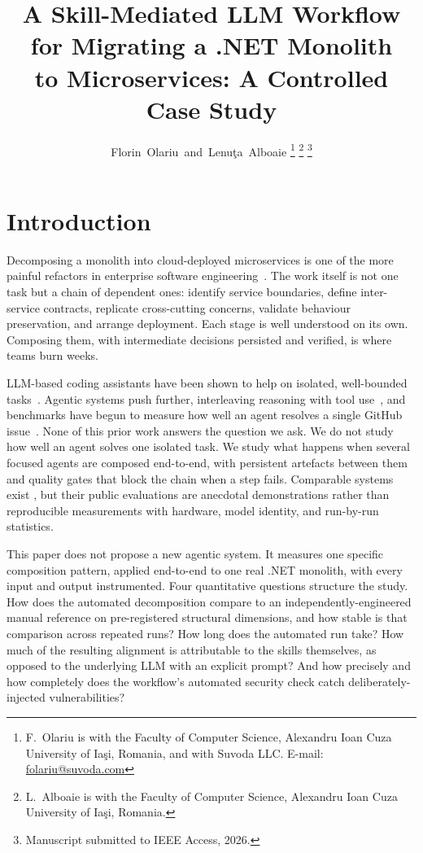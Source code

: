 \documentclass[journal]{IEEEtran}
\title{A Skill-Mediated LLM Workflow for Migrating a .NET Monolith\\
       to Microservices: A Controlled Case Study}
\author{Florin~Olariu~and~Lenu\c{t}a~Alboaie%
  \thanks{F.~Olariu is with the Faculty of Computer Science,
    Alexandru Ioan Cuza University of Ia\c{s}i, Romania, and with
    Suvoda LLC. E-mail: \url{folariu@suvoda.com}}%
  \thanks{L.~Alboaie is with the Faculty of Computer Science,
    Alexandru Ioan Cuza University of Ia\c{s}i, Romania.}%
  \thanks{Manuscript submitted to IEEE Access, 2026.}}
\begin{document}
\maketitle
\IEEEdisplaynontitleabstractindextext
\IEEEpeerreviewmaketitle

\section{Introduction}
\label{sec:intro}

Decomposing a monolith into cloud-deployed microservices is one of the
more painful refactors in enterprise software
engineering~\cite{newman2019monolith,taibi2017processes}. The work
itself is not one task but a chain of dependent ones: identify service
boundaries, define inter-service contracts, replicate cross-cutting
concerns, validate behaviour preservation, and arrange deployment.
Each stage is well understood on its own. Composing them, with
intermediate decisions persisted and verified, is where teams burn
weeks.

LLM-based coding assistants have been shown to help on isolated,
well-bounded
tasks~\cite{peng2023copilot,vaithilingam2022expectation,hou2024llmse}.
Agentic systems push further, interleaving reasoning with tool
use~\cite{yao2023react,wang2024agents}, and benchmarks have begun to
measure how well an agent resolves a single GitHub
issue~\cite{jimenez2024swebench,yang2024sweagent}. None of this prior
work answers the question we ask. We do not study how well an agent
solves one isolated task. We study what happens when several focused
agents are composed end-to-end, with persistent artefacts between
them and quality gates that block the chain when a step fails.
Comparable systems exist
\cite{hong2024metagpt,qian2024chatdev,cognition2024devin}, but their
public evaluations are anecdotal demonstrations rather than
reproducible measurements with hardware, model identity, and
run-by-run statistics.

This paper does not propose a new agentic system. It measures one
specific composition pattern, applied end-to-end to one real .NET
monolith, with every input and output instrumented. Four
quantitative questions structure the study. How does the automated
decomposition compare to an independently-engineered manual reference
on pre-registered structural dimensions, and how stable is that
comparison across repeated runs? How long does the automated run
take? How much of the resulting alignment is attributable to the
skills themselves, as opposed to the underlying LLM with an explicit
prompt? And how precisely and how completely does the workflow's
automated security check catch deliberately-injected vulnerabilities?
\end{document}
